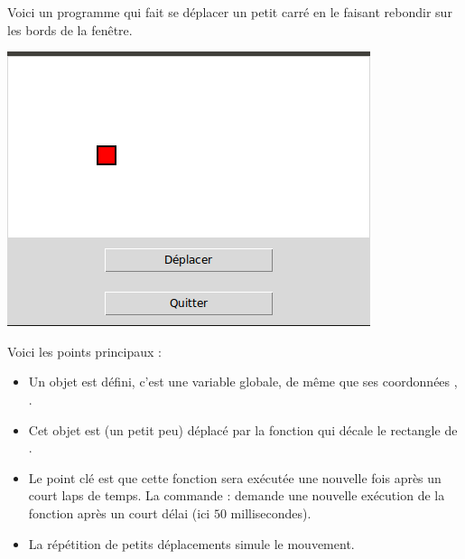 \documentclass[11pt,class=report,crop=false]{standalone}
\begin{document}
Voici un programme qui fait se déplacer un petit carré en le faisant rebondir sur les bords de la fenêtre.

\begin{center}
\includegraphics[scale=\myscale,scale=0.5]{../aleatoire/ecran-alea-cours-mouv}
\end{center}

Voici les points principaux :
\begin{itemize}
  \item Un objet  est défini, c'est une variable globale, de même que ses coordonnées , .
  
  \item Cet objet est (un petit peu) déplacé par la fonction  qui décale le rectangle de .
  
  \item Le point clé est que cette fonction sera exécutée une nouvelle fois après un court laps de temps. La commande :
  demande une nouvelle exécution de la fonction  après un court délai (ici $50$ millisecondes).

  \item La répétition de petits déplacements simule le mouvement.
\end{itemize}
\end{document}
